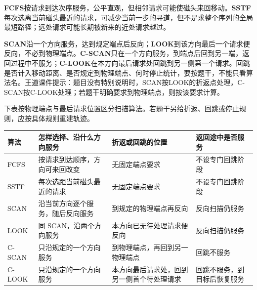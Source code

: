 \textbf{FCFS}按请求到达次序服务，公平直观，但相邻请求可能使磁头来回移动。\textbf{SSTF}每次选离当前磁头最近的请求，可减少当前一步的寻道，但不是求整个序列的全局最短路径；远处请求可能长期被新来的近处请求越过。

\textbf{SCAN}沿一个方向服务，达到规定端点后反向；\textbf{LOOK}到该方向最后一个请求便反向，不必到物理端点。\textbf{C-SCAN}只在一个方向服务，到端点后回到另一端，返回过程中不服务；\textbf{C-LOOK}在本方向最后请求处回跳到另一侧第一个请求。回跳是否计入移动距离、是否规定到物理端点、何时停止统计，要按题干，不能只看算法名。王道课件提示：题目没有特别说明时，SCAN按LOOK的折返点处理，C-SCAN按C-LOOK处理；若题干明确要求到物理端点，则按该要求计算。

下表按物理端点与最后请求位置区分扫描算法。若题干另给折返、回跳或停止规则，应按具体规则重建轨迹。

\begin{wideblock}

\par\medskip\noindent\begin{minipage}{\linewidth}\fontsize{9.3}{12}\selectfont\begin{tabularx}{\linewidth}{@{}YYYY@{}}
\toprule\noalign{}
\begin{minipage}[b]{\linewidth}\raggedright
算法
\end{minipage} & \begin{minipage}[b]{\linewidth}\raggedright
怎样选择、沿什么方向服务
\end{minipage} & \begin{minipage}[b]{\linewidth}\raggedright
折返或回跳的位置
\end{minipage} & \begin{minipage}[b]{\linewidth}\raggedright
返回途中是否服务
\end{minipage} \\
\midrule\noalign{}


FCFS & 按请求到达顺序，方向可来回改变 & 无固定端点要求 & 不设专门回跳阶段 \\
SSTF & 每次选距当前磁头最近的请求 & 无固定端点要求 & 不设专门回跳阶段 \\
SCAN & 沿当前方向逐个服务，随后反向服务 & 到规定的物理端点再反向 & 反向扫描仍服务 \\
LOOK & 同 SCAN，沿两个方向服务 & 本方向已无待处理请求便反向 & 反向扫描仍服务 \\
C-SCAN & 只沿规定的一个方向服务 & 到物理端点，再回到另一物理端点 & 回跳不服务 \\
C-LOOK & 只沿规定的一个方向服务 & 本方向最后请求处，回到另一侧首个待处理请求 & 回跳不服务，到目标后恢复服务 \\
\bottomrule\end{tabularx}
\end{minipage}\par\medskip

\end{wideblock}

